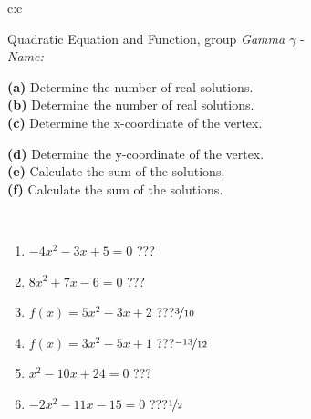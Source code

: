 \documentclass[10pt]{report}
\begin{document}
\begin{tabular}{c:c}
\begin{minipage}[c][104.5mm][t]{0.5\linewidth}
\begin{center}
\vspace{7mm}
{\huge {\LARGE Quadratic Equation and Function}, group \textit{Gamma $\gamma$} -}\\[5mm]
\textit{Name:}\phantom{xxxxxxxxxxxxxxxxxxxxxxxxxxxxxxxxxxxxxxxxxxxxxxxxxxxxxxxxxxxxxxxxx}\\[5mm]
\begin{minipage}{0.95\linewidth}
\begin{center}
{\small \begin{minipage}{0.5\textwidth}
\textbf{(a)} Determine the number of real solutions. \\[1mm]
\textbf{(b)} Determine the number of real solutions. \\[1mm]
\textbf{(c)} Determine the x-coordinate of the vertex.
\end{minipage} \begin{minipage}{0.49\textwidth}
\textbf{(d)} Determine the y-coordinate of the vertex. \\[1mm]
\textbf{(e)} Calculate the sum of the solutions. \\[1mm]
\textbf{(f)} Calculate the sum of the solutions.
\end{minipage}
}
\end{center}
\end{minipage}
\\[4mm]
\begin{minipage}{0.79\linewidth}
\begin{center}
\begin{varwidth}{\linewidth}
\begin{enumerate}
\Large
\item $-4x^2-3x+5=0$\quad \dotfill\; ???\;\dotfill {}
\item $8x^2+7x-6=0$\quad \dotfill\; ???\;\dotfill {}
\item $f(x)=5x^2-3x+2$\quad \dotfill\; ???\;\dotfill \quad $\nicefrac{3}{10}$
\item $f(x)=3x^2-5x+1$\quad \dotfill\; ???\;\dotfill \quad $\nicefrac{-13}{12}$
\item $x^2-10x+24=0$\quad \dotfill\; ???\;\dotfill {}
\item $-2x^2-11x-15=0$\quad \dotfill\; ???\;\dotfill \quad $\nicefrac{1}{2}$
\end{enumerate}
\end{varwidth}

\end{center}
\end{minipage}
\end{center}
\end{minipage}
\end{tabular}
\end{document}
